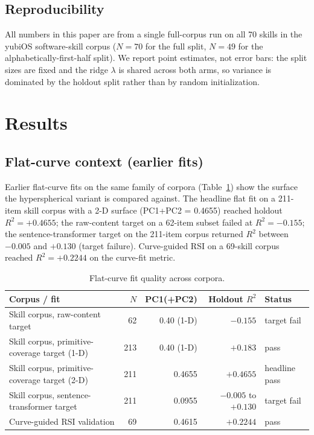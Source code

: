\documentclass[11pt,a4paper]{article}
\begin{document}
\subsection{Reproducibility}
All numbers in this paper are from a single full-corpus run on all 70 skills in the yubiOS software-skill corpus ($N=70$ for the full split, $N=49$ for the alphabetically-first-half split). We report point estimates, not error bars: the split sizes are fixed and the ridge $\lambda$ is shared across both arms, so variance is dominated by the holdout split rather than by random initialization.

\section{Results}

\subsection{Flat-curve context (earlier fits)}
Earlier flat-curve fits on the same family of corpora (Table~\ref{tab:context}) show the surface the hyperspherical variant is compared against. The headline flat fit on a 211-item skill corpus with a 2-D surface (PC1+PC2 = 0.4655) reached holdout $R^2 = +0.4655$; the raw-content target on a 62-item subset failed at $R^2 = -0.155$; the sentence-transformer target on the 211-item corpus returned $R^2$ between $-0.005$ and $+0.130$ (target failure). Curve-guided RSI on a 69-skill corpus reached $R^2 = +0.2244$ on the curve-fit metric.

\begin{table}[h]
\centering
\begin{tabular}{@{}lrrrl@{}}
\toprule
Corpus / fit & $N$ & PC1(+PC2) & Holdout $R^2$ & Status \\
\midrule
Skill corpus, raw-content target & 62  & 0.40 (1-D) & $-0.155$  & target fail \\
Skill corpus, primitive-coverage target (1-D) & 213 & 0.40 (1-D) & $+0.183$  & pass \\
Skill corpus, primitive-coverage target (2-D) & 211 & 0.4655     & $+0.4655$ & headline pass \\
Skill corpus, sentence-transformer target & 211 & 0.0955     & $-0.005$ to $+0.130$ & target fail \\
Curve-guided RSI validation & 69  & 0.4615     & $+0.2244$ & pass \\
\bottomrule
\end{tabular}
\caption{Flat-curve fit quality across corpora.}
\label{tab:context}
\end{table}
\end{document}
